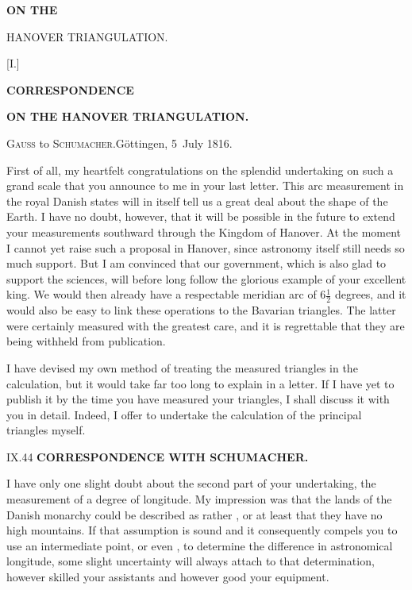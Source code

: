 \vspace*{40mm}
\begin{center}
{\Large\bfseries ON THE\par\medskip HANOVER TRIANGULATION.}
\end{center}
\clearpage\null\clearpage
\begin{center}
[I.]\par\medskip
{\Large\bfseries CORRESPONDENCE}\par\medskip
{\bfseries ON THE HANOVER TRIANGULATION.}\par\bigskip
[1.]\par\medskip
\textsc{Gauss} to \textsc{Schumacher}.\quad Göttingen, 5~July 1816.
\end{center}

\par\noindent\hspace*{\parindent}First of all, my heartfelt congratulations on the splendid undertaking on such a grand scale that you announce to me in your last letter. This arc measurement in the royal Danish states will in itself tell us a great deal about the shape of the Earth. I have no doubt, however, that it will be possible in the future to extend your measurements southward through the Kingdom of Hanover. At the moment I cannot yet raise such a proposal in Hanover, since astronomy itself still needs so much support. But I am convinced that our government, which is also glad to support the sciences, will before long follow the glorious example of your excellent king. We would then already have a respectable meridian arc of \(6\frac{1}{2}\) degrees, and it would also be easy to link these operations to the Bavarian triangles. The latter were certainly measured with the greatest care, and it is regrettable that they are being withheld from publication.

\par\noindent\hspace*{\parindent}I have devised my own method of treating the measured triangles in the calculation, but it would take far too long to explain in a letter. If I have yet to publish it by the time you have measured your triangles, I shall discuss it with you in detail. Indeed, I offer to undertake the calculation of the principal triangles myself.
\par\medskip\noindent IX.\hfill44
\clearpage
{}\hfill{\small\textbf{CORRESPONDENCE WITH SCHUMACHER.}}\par\medskip

\par\noindent\hspace*{\parindent}I have only one slight doubt about the second part of your undertaking, the measurement of a degree of longitude. My impression was that the lands of the Danish monarchy could be described as rather , or at least that they have no high mountains. If that assumption is sound and it consequently compels you to use an intermediate point, or even , to determine the difference in astronomical longitude, some slight uncertainty will always attach to that determination, however skilled your assistants and however good your equipment.

